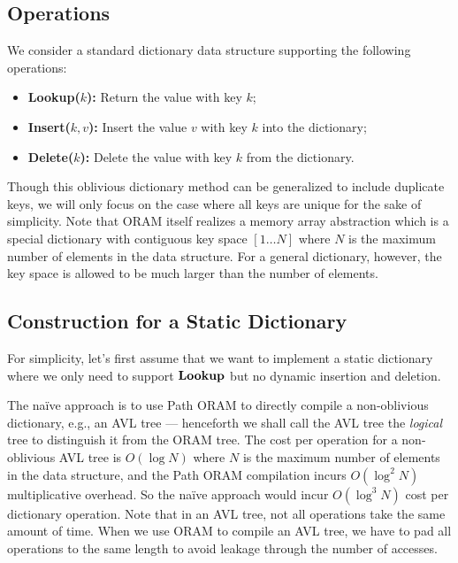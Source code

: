 \documentclass[11pt]{article}
\begin{document}
\subsection{Operations}
We consider a standard dictionary data structure
supporting the following operations: 
\begin{itemize}
    \item \textbf{Lookup($k$):} Return the value with key $k$;
    \item \textbf{Insert($k, v$):} 
Insert the value $v$ with key $k$ into the dictionary; 
    \item \textbf{Delete($k$):} Delete the value with key $k$ from the dictionary.
\end{itemize}
Though this oblivious dictionary method can be generalized to include duplicate keys, we will only focus on the case where all keys are unique for the sake of simplicity. Note that ORAM itself 
realizes a memory array abstraction which is 
a special dictionary with contiguous key space $[1\ldots N]$
where $N$ is the maximum number of elements in the data structure.
For a general dictionary, however, the key space is allowed
to be much larger than the number of elements.


\subsection{Construction for a Static Dictionary}
For simplicity, let's first assume
that we want to implement a static dictionary 
where we only need to support ${\bf Lookup}$ but no dynamic insertion
and deletion. 

The na\"ive approach is to use Path ORAM to directly compile a non-oblivious
dictionary, e.g., an AVL tree --- henceforth we shall
call the AVL tree the {\it logical} tree to distinguish
it from the ORAM tree.
The cost per operation for a non-oblivious AVL tree is $O(\log N)$
where $N$ is the maximum number of elements in the data structure, 
and the Path ORAM
compilation incurs $O(\log^2 N)$ multiplicative overhead.
So the na\"ive approach would incur $O(\log^3 N)$ 
cost per dictionary operation. Note that 
in an AVL tree, not all operations
take the same amount of time. 
When we use ORAM to compile an AVL tree, we have to pad all operations to
the same length to avoid leakage through the number of 
accesses.
\end{document}
